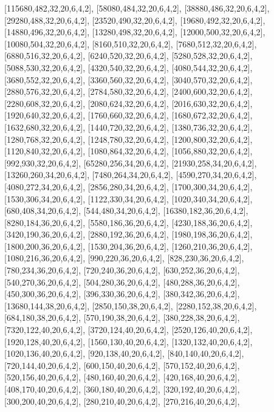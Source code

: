 \documentclass[12pt]{amsart}
\begin{document}
[115680,482,32,20,6,4,2],   [58080,484,32,20,6,4,2],   [38880,486,32,20,6,4,2],   [29280,488,32,20,6,4,2],   [23520,490,32,20,6,4,2],   [19680,492,32,20,6,4,2],
[14880,496,32,20,6,4,2],   [13280,498,32,20,6,4,2],   [12000,500,32,20,6,4,2],   [10080,504,32,20,6,4,2],   [8160,510,32,20,6,4,2],   [7680,512,32,20,6,4,2],
[6880,516,32,20,6,4,2],   [6240,520,32,20,6,4,2],   [5280,528,32,20,6,4,2],   [5088,530,32,20,6,4,2],   [4320,540,32,20,6,4,2],   [4080,544,32,20,6,4,2],
[3680,552,32,20,6,4,2],   [3360,560,32,20,6,4,2],   [3040,570,32,20,6,4,2],   [2880,576,32,20,6,4,2],   [2784,580,32,20,6,4,2],   [2400,600,32,20,6,4,2],
[2280,608,32,20,6,4,2],   [2080,624,32,20,6,4,2],   [2016,630,32,20,6,4,2],   [1920,640,32,20,6,4,2],   [1760,660,32,20,6,4,2],   [1680,672,32,20,6,4,2],
[1632,680,32,20,6,4,2],   [1440,720,32,20,6,4,2],   [1380,736,32,20,6,4,2],   [1280,768,32,20,6,4,2],   [1248,780,32,20,6,4,2],   [1200,800,32,20,6,4,2],
[1120,840,32,20,6,4,2],   [1080,864,32,20,6,4,2],   [1056,880,32,20,6,4,2],   [992,930,32,20,6,4,2],   [65280,256,34,20,6,4,2],   [21930,258,34,20,6,4,2],
[13260,260,34,20,6,4,2],   [7480,264,34,20,6,4,2],   [4590,270,34,20,6,4,2],   [4080,272,34,20,6,4,2],   [2856,280,34,20,6,4,2],   [1700,300,34,20,6,4,2],
[1530,306,34,20,6,4,2],   [1122,330,34,20,6,4,2],   [1020,340,34,20,6,4,2],   [680,408,34,20,6,4,2],   [544,480,34,20,6,4,2],   [16380,182,36,20,6,4,2],
[8280,184,36,20,6,4,2],   [5580,186,36,20,6,4,2],   [4230,188,36,20,6,4,2],   [3420,190,36,20,6,4,2],   [2880,192,36,20,6,4,2],   [1980,198,36,20,6,4,2],
[1800,200,36,20,6,4,2],   [1530,204,36,20,6,4,2],   [1260,210,36,20,6,4,2],   [1080,216,36,20,6,4,2],   [990,220,36,20,6,4,2],   [828,230,36,20,6,4,2],
[780,234,36,20,6,4,2],   [720,240,36,20,6,4,2],   [630,252,36,20,6,4,2],   [540,270,36,20,6,4,2],   [504,280,36,20,6,4,2],   [480,288,36,20,6,4,2],
[450,300,36,20,6,4,2],   [396,330,36,20,6,4,2],   [380,342,36,20,6,4,2],   [13680,144,38,20,6,4,2],   [2850,150,38,20,6,4,2],   [2280,152,38,20,6,4,2],
[684,180,38,20,6,4,2],   [570,190,38,20,6,4,2],   [380,228,38,20,6,4,2],   [7320,122,40,20,6,4,2],   [3720,124,40,20,6,4,2],   [2520,126,40,20,6,4,2],
[1920,128,40,20,6,4,2],   [1560,130,40,20,6,4,2],   [1320,132,40,20,6,4,2],   [1020,136,40,20,6,4,2],   [920,138,40,20,6,4,2],   [840,140,40,20,6,4,2],
[720,144,40,20,6,4,2],   [600,150,40,20,6,4,2],   [570,152,40,20,6,4,2],   [520,156,40,20,6,4,2],   [480,160,40,20,6,4,2],   [420,168,40,20,6,4,2],
[408,170,40,20,6,4,2],   [360,180,40,20,6,4,2],   [320,192,40,20,6,4,2],   [300,200,40,20,6,4,2],   [280,210,40,20,6,4,2],   [270,216,40,20,6,4,2],
\end{document}
